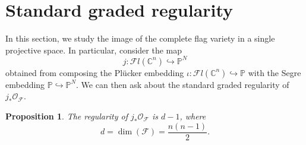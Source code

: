 \documentclass[12pt,reqno]{amsart}
\newtheorem{proposition}[theorem]{Proposition}
\theoremstyle{definition}
\theoremstyle{remark}
\newcommand{\calF}{{\mathcal{F}}}
\newcommand{\calO}{{\mathcal{O}}}
\begin{document}
\section{Standard graded regularity}\label{sec:CMreg}

In this section, we study the image of the complete flag variety in a single projective space.  In particular, consider the map
\begin{equation*}
    j: \calF l(\mathbb C^n) \hookrightarrow \mathbb P^N
\end{equation*}
obtained from composing the Pl\"ucker embedding $\iota: \calF l(\mathbb C^n) \hookrightarrow \mathbb P$ with the Segre embedding $\mathbb P \hookrightarrow \mathbb P^N$.  We can then ask about the standard graded regularity of $j_*\calO_{\calF}$.

\begin{proposition}
The regularity of $j_*\calO_{\calF}$ is $d-1$, where
\begin{equation*}
    d = \dim(\calF) = \frac{n(n-1)}{2}.
\end{equation*}
\end{proposition}
\end{document}
